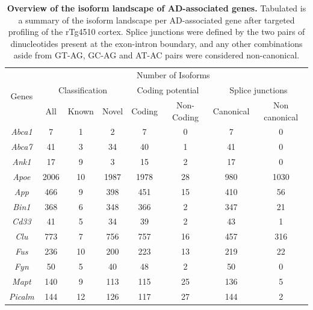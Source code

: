 \vspace{1cm}
\begin{table}[]
	\centering
	\captionsetup{width=0.95\textwidth}
	\caption[Overview of the isoform landscape of AD-associated genes]%
	{\textbf{Overview of the isoform landscape of AD-associated genes.} Tabulated is a summary of the isoform landscape per AD-associated gene after targeted profiling of the rTg4510 cortex. Splice junctions were defined by the two pairs of dinucleotides present at the exon-intron boundary, and any other combinations aside from GT-AG, GC-AG and AT-AC pairs were considered non-canonical.}
	\label{tab: merged_targeted_num}
	\centering
	\setlength\tabcolsep{5pt} %
	\begin{tabular}{@{}cccccccc@{}}
		\toprule
		\multirow{3}{*}{Genes} & \multicolumn{7}{c}{Number of Isoforms}                                                                    \\ \cmidrule(l){2-8} 
		& \multicolumn{3}{c}{Classification} & \multicolumn{2}{c}{Coding potential} & \multicolumn{2}{c}{Splice junctions} \\ \cmidrule(l){2-8} 
		& All      & Known      & Novel      & Coding          & Non-Coding         & Canonical     & Non canonical    \\ \midrule
		\textit{Abca1}  & 7    & 1  & 2    & 7    & 0   & 7   & 0    \\
		\textit{Abca7}  & 41   & 3  & 34   & 40   & 1   & 41  & 0    \\
		\textit{Ank1}   & 17   & 9  & 3    & 15   & 2   & 17  & 0    \\
		\textit{Apoe}   & 2006 & 10 & 1987 & 1978 & 28  & 980 & 1030 \\
		\textit{App}    & 466  & 9  & 398  & 451  & 15  & 410 & 56   \\
		\textit{Bin1}   & 368  & 6  & 348  & 366  & 2   & 347 & 21   \\
		\textit{Cd33}   & 41   & 5  & 34   & 39   & 2   & 43  & 1    \\
		\textit{Clu}    & 773  & 7  & 756  & 757  & 16  & 457 & 316  \\
		\textit{Fus}    & 236  & 10 & 200  & 223  & 13  & 219 & 22   \\
		\textit{Fyn}    & 50   & 5  & 40   & 48   & 2   & 50  & 0    \\
		\textit{Mapt}   & 140  & 9  & 113  & 115  & 25  & 136 & 5    \\
		\textit{Picalm} & 144  & 12 & 126  & 117  & 27  & 144 & 2    \\

\end{tabular}
\end{table}
